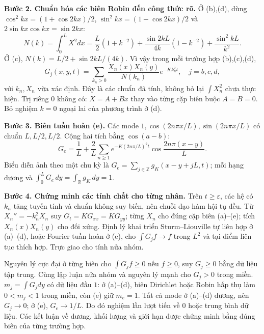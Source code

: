 \documentclass[10pt,a4paper]{article}
\begin{document}
\textbf{Bước 2. Chuẩn hóa các biên Robin đến công thức rõ.}
Ở (b),(d), dùng $\cos^2kx=(1+\cos2kx)/2$, $\sin^2kx=(1-\cos2kx)/2$ và $2\sin kx\cos kx=\sin2kx$:
\[N(k)=\int_0^LX^2dx
=\frac L2(1+k^{-2})+\frac{\sin2kL}{4k}(1-k^{-2})+\frac{\sin^2kL}{k^2}.\]
Ở (c), $N(k)=L/2+\sin2kL/(4k)$. Vì vậy trong mỗi trường hợp (b),(c),(d),
\[G_j(x,y,t)=\sum_{k_n>0}\frac{X_n(x)X_n(y)}{N(k_n)}e^{-Kk_n^2t},\quad j=b,c,d,\]
với $k_n,X_n$ vừa xác định. Đây là các chuẩn đã tính, không bỏ lại $\int X_n^2$ chưa thực hiện. Trị riêng $0$ không có: $X=A+Bx$ thay vào từng cặp biên buộc $A=B=0$. Bỏ nghiệm $k=0$ ngoại lai của phương trình ở (d).

\textbf{Bước 3. Biên tuần hoàn (e).}
Các mode $1,\cos(2n\pi x/L),\sin(2n\pi x/L)$ có chuẩn $L,L/2,L/2$. Cộng hai tích bằng $\cos(a-b)$:
\[G_e=\frac1L+\frac2L\sum_{n\ge1}e^{-K(2n\pi/L)^2t}\cos\frac{2n\pi(x-y)}L.\]
Biểu diễn ảnh theo một chu kỳ là $G_e=\sum_{j\in\mathbb Z}g_K(x-y+jL,t)$; mỗi hạng dương và $\int_0^LG_e\,dy=\int_{\mathbb R}g_K\,dy=1$.

\textbf{Bước 4. Chứng minh các tính chất cho từng nhân.}
Trên $t\ge\varepsilon$, các hệ có $k_n$ tăng tuyến tính và chuẩn không suy biến, nên chuỗi đạo hàm hội tụ đều. Từ $X_n''=-k_n^2X_n$ suy $G_t=KG_{xx}=KG_{yy}$; từng $X_n$ cho đúng cặp biên (a)--(e); tích $X_n(x)X_n(y)$ cho đối xứng. Định lý khai triển Sturm–Liouville tự liên hợp ở (a)--(d), hoặc Fourier tuần hoàn ở (e), cho $\int G_jf\to f$ trong $L^2$ và tại điểm liên tục thích hợp. Trực giao cho tính nửa nhóm.

Nguyên lý cực đại ở từng biên cho $\int G_jf\ge0$ nếu $f\ge0$, suy $G_j\ge0$ bằng dữ liệu tập trung. Cùng lập luận nửa nhóm và nguyên lý mạnh cho $G_j>0$ trong miền. $m_j=\int G_jdy$ có dữ liệu đầu $1$: ở (a)--(d), biên Dirichlet hoặc Robin hấp thụ làm $0<m_j<1$ trong miền, còn (e) giữ $m_e=1$. Tất cả mode ở (a)--(d) dương, nên $G_j\to0$; ở (e), $G_e\to1/L$. Do đó nghiệm lần lượt tiến về $0$ hoặc trung bình dữ liệu. Các kết luận về dương, khối lượng và giới hạn được chứng minh bằng đúng biên của từng trường hợp.
\end{document}

